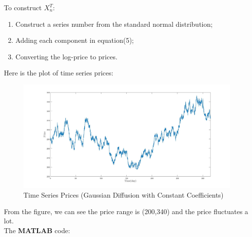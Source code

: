 \documentclass[12pt,letterpaper]{article}
\begin{document}
\begin{enumerate}[label=\textbf{(\Alph*)}]
  To construct $X_n^T$:
  \begin{enumerate}[label=(\roman*)]
  	\item Construct a series number from the standard normal distribution;
  	\item Adding each component in equation(5);
  	\item Converting the log-price to prices.
  \end{enumerate}
 
  Here is the plot of time series prices:
        \begin{figure}[H]
            \centering
            \includegraphics[width=15cm]{figures/p1_ex1.jpg}
            \caption{Time Series Prices (Gaussian Diffusion with Constant Coefficients)}
            \label{fig:1}
        \end{figure}
 From the figure, we can see the price range is (200,340) and the price fluctuates a lot.\\
 
  The \textbf{MATLAB} code:
   
   
   
\end{enumerate}
\newpage

\end{document}
